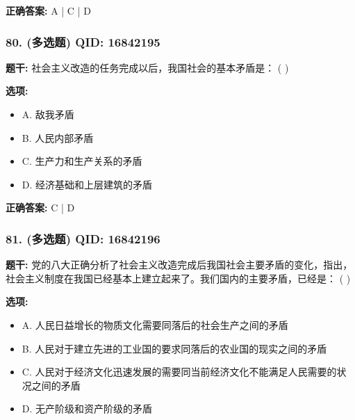 \documentclass[12pt,UTF8]{ctexart}
\begin{document}
\textbf{正确答案:}
A | C | D

\vspace{0.3em}\hrulefill\vspace{0.7em}

\subsubsection*{80. (多选题) \small QID: 16842195}

\textbf{题干:}
社会主义改造的任务完成以后，我国社会的基本矛盾是： ( )

\textbf{选项:}
\begin{itemize}[leftmargin=*]

  \item A. 敌我矛盾

  \item B. 人民内部矛盾

  \item C. 生产力和生产关系的矛盾

  \item D. 经济基础和上层建筑的矛盾

\end{itemize}

\textbf{正确答案:}
C | D

\vspace{0.3em}\hrulefill\vspace{0.7em}

\subsubsection*{81. (多选题) \small QID: 16842196}

\textbf{题干:}
党的八大正确分析了社会主义改造完成后我国社会主要矛盾的变化，指出，社会主义制度在我国已经基本上建立起来了。我们国内的主要矛盾，已经是： ( )

\textbf{选项:}
\begin{itemize}[leftmargin=*]

  \item A. 人民日益增长的物质文化需要同落后的社会生产之间的矛盾

  \item B. 人民对于建立先进的工业国的要求同落后的农业国的现实之间的矛盾

  \item C. 人民对于经济文化迅速发展的需要同当前经济文化不能满足人民需要的状况之间的矛盾

  \item D. 无产阶级和资产阶级的矛盾

\end{itemize}
\end{document}
